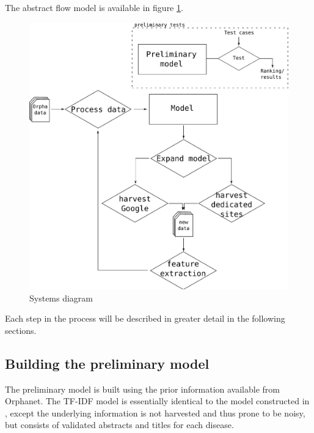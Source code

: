 \documentclass[10pt,letterpaper,final]{article}
\begin{document}

The abstract
flow model is available in figure \ref{fig:flow}.


\begin{figure}[htp!]
\begin{center}
\includegraphics[scale=0.4]{images/pipeline}
\caption{Systems diagram}
\label{fig:flow}
\end{center}
\end{figure}

Each step in the process will be described in greater detail in the
following sections.


\subsection{Building the preliminary model}
The preliminary model is built using the prior information available
from Orphanet. The TF-IDF model is essentially identical to the model
constructed in \cite{jensenandersen}, except the underlying information
is not harvested and thus prone to be noisy, but consists of validated
abstracts and titles for each disease.
\end{document}
